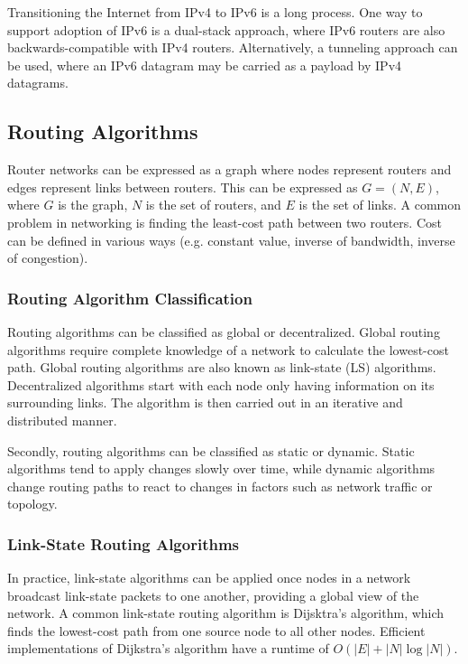 \documentclass[12pt,titlepage]{article}
\begin{document}
        Transitioning the Internet from IPv4 to IPv6 is a long process. One way to support adoption of IPv6 is a dual-stack approach, where IPv6
        routers are also backwards-compatible with IPv4 routers. Alternatively, a tunneling approach can be used, where an IPv6 datagram may be
        carried as a payload by IPv4 datagrams.

    \subsection{Routing Algorithms}
      Router networks can be expressed as a graph where nodes represent routers and edges represent links between routers. This can be expressed as
      $G = (N,E)$, where $G$ is the graph, $N$ is the set of routers, and $E$ is the set of links. A common problem in networking is finding the
      least-cost path between two routers. Cost can be defined in various ways (e.g. constant value, inverse of bandwidth, inverse of congestion).

      \subsubsection{Routing Algorithm Classification}
        Routing algorithms can be classified as global or decentralized. Global routing algorithms require complete knowledge of a network to calculate
        the lowest-cost path. Global routing algorithms are also known as link-state (LS) algorithms. Decentralized algorithms start with each node
        only having information on its surrounding links. The algorithm is then carried out in an iterative and distributed manner.

        Secondly, routing algorithms can be classified as static or dynamic. Static algorithms tend to apply changes slowly over time, while dynamic
        algorithms change routing paths to react to changes in factors such as network traffic or topology.

      \subsubsection{Link-State Routing Algorithms}
        In practice, link-state algorithms can be applied once nodes in a network broadcast link-state packets to one another, providing a global view
        of the network. A common link-state routing algorithm is Dijsktra's algorithm, which finds the lowest-cost path from one source node to all
        other nodes. Efficient implementations of Dijkstra's algorithm have a runtime of $O(|E| + |N|\log{|N|})$.
\end{document}
